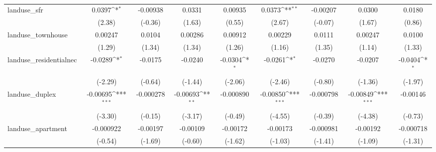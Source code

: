 \begin{table}[htbp]\centering
\def\sym#1{\ifmmode^{#1}\else\(^{#1}\)\fi}
\caption{ \label{tab1}}
\begin{tabular}{l*{8}{c}}
\toprule
\midrule
landuse\_sfr         &      0.0397\sym{*}  &    -0.00938         &      0.0331         &     0.00935         &      0.0373\sym{**} &    -0.00207         &      0.0300         &      0.0180         \\
                    &      (2.38)         &     (-0.36)         &      (1.63)         &      (0.55)         &      (2.67)         &     (-0.07)         &      (1.67)         &      (0.86)         \\
\addlinespace
landuse\_townhouse   &     0.00247         &      0.0104         &     0.00286         &     0.00912         &     0.00229         &      0.0111         &     0.00247         &      0.0100         \\
                    &      (1.29)         &      (1.34)         &      (1.34)         &      (1.26)         &      (1.16)         &      (1.35)         &      (1.14)         &      (1.33)         \\
\addlinespace
landuse\_residentialnec&     -0.0289\sym{*}  &     -0.0175         &     -0.0240         &     -0.0304\sym{*}  &     -0.0261\sym{*}  &     -0.0270         &     -0.0207         &     -0.0404\sym{*}  \\
                    &     (-2.29)         &     (-0.64)         &     (-1.44)         &     (-2.06)         &     (-2.46)         &     (-0.80)         &     (-1.36)         &     (-1.97)         \\
\addlinespace
landuse\_duplex      &    -0.00695\sym{***}&   -0.000278         &    -0.00693\sym{**} &   -0.000890         &    -0.00850\sym{***}&   -0.000798         &    -0.00849\sym{***}&    -0.00146         \\
                    &     (-3.30)         &     (-0.15)         &     (-3.17)         &     (-0.49)         &     (-4.55)         &     (-0.39)         &     (-4.38)         &     (-0.73)         \\
\addlinespace
landuse\_apartment   &   -0.000922         &    -0.00197         &    -0.00109         &    -0.00172         &    -0.00173         &   -0.000981         &    -0.00192         &   -0.000718         \\
                    &     (-0.54)         &     (-1.69)         &     (-0.60)         &     (-1.62)         &     (-1.03)         &     (-1.41)         &     (-1.09)         &     (-1.31)         \\

\end{tabular}
\end{table}
